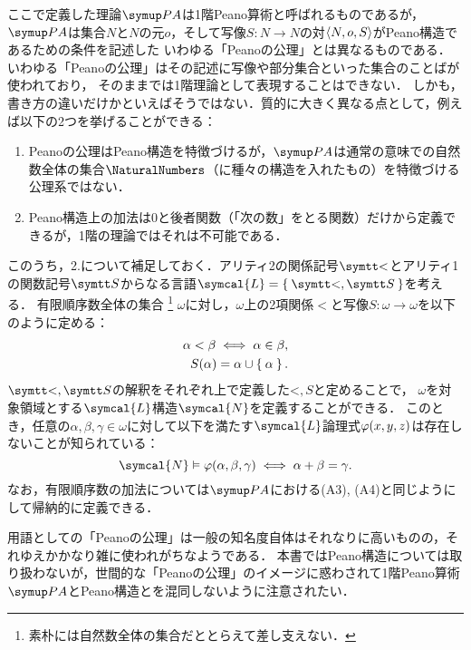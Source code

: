\begin{Note}
	ここで定義した理論\(\PA\)は1階Peano算術と呼ばれるものであるが，
	\(\PA\)は集合\(N\)と\(N\)の元\(o\)，そして写像\(S \colon N \to N\)の対\(\langle N, o, S \rangle\)がPeano構造であるための条件を記述した
	いわゆる「Peanoの公理」とは異なるものである．
	いわゆる「Peanoの公理」はその記述に写像や部分集合といった集合のことばが使われており，
	そのままでは1階理論として表現することはできない．
	しかも，書き方の違いだけかといえばそうではない．質的に大きく異なる点として，例えば以下の2つを挙げることができる：
	\begin{enumerate}
		\item Peanoの公理はPeano構造を特徴づけるが，\(\PA\)は通常の意味での自然数全体の集合\(\NaturalNumbers\)（に種々の構造を入れたもの）を特徴づける公理系ではない．
		\item Peano構造上の加法は0と後者関数（「次の数」をとる関数）だけから定義できるが，1階の理論ではそれは不可能である．
	\end{enumerate}

	このうち，2.について補足しておく．アリティ2の関係記号\(\obj{<}\)とアリティ1の関数記号\(\obj{S}\)からなる言語\(\symcal{L} = \Set{\obj{<}, \obj{S}}\)を考える．
	有限順序数全体の集合%
	\footnote{%
		素朴には自然数全体の集合だととらえて差し支えない．%
	}%
	\(\omega\)に対し，\(\omega\)上の2項関係\(<\)と写像\(S \colon \omega \to \omega\)を以下のように定める：
	\begin{align*}
		\alpha < \beta \metaequivalent \alpha \in \beta, \\
		\apply{S}{\alpha} = \alpha \cup \Set{\alpha}.
	\end{align*}
	\(\obj{<}, \obj{S}\)の解釈をそれぞれ上で定義した\(\mathord{<}, S\)と定めることで，
	\(\omega\)を対象領域とする\(\symcal{L}\)構造\(\symcal{N}\)を定義することができる．
	このとき，任意の\(\alpha, \beta, \gamma \in \omega\)に対して以下を満たす\(\symcal{L}\)論理式\(\apply{\varphi}{x, y, z}\)は存在しないことが知られている：
	\[
		\symcal{N} \satisfy \apply{\varphi}{\alpha, \beta, \gamma} \metaequivalent \alpha + \beta = \gamma.
	\]
	なお，有限順序数の加法については\(\PA\)における(A3), (A4)と同じようにして帰納的に定義できる．

	用語としての「Peanoの公理」は一般の知名度自体はそれなりに高いものの，それゆえかかなり雑に使われがちなようである．
	本書ではPeano構造については取り扱わないが，世間的な「Peanoの公理」のイメージに惑わされて1階Peano算術\(\PA\)とPeano構造とを混同しないように注意されたい．
\end{Note}